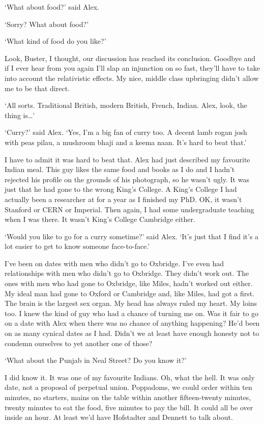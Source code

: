`What about food?' said Alex.

`Sorry? What about food?'

`What kind of food do you like?'

Look, Buster, I thought, our discussion has reached its conclusion.
Goodbye and if I ever hear from you again I'll slap an injunction on
so fast, they'll have to take into account the relativistic effects.
My nice, middle class upbringing didn't allow me to be that direct.

`All sorts. Traditional British, modern British, French, Indian.
Alex, look, the thing is\dots'

`Curry?' said Alex. `Yes, I'm a big fan of curry too. A decent lamb
rogan josh with peas pilau, a mushroom bhaji and a keema naan. It's
hard to beat that.'

I have to admit it was hard to beat that. Alex had just described my
favourite Indian meal. This guy likes the same food and books as I
do and I hadn't rejected his profile on the grounds of his
photograph, so he wasn't ugly. It was just that he had gone to the
wrong King's College. A King's College I had actually been a researcher at for a year as I finished my PhD. OK, it wasn't Stanford or CERN or Imperial. Then again, I had some undergraduate teaching when I was there. It wasn't King's College Cambridge either.

`Would you like to go for a curry sometime?' said Alex. `It's just
that I find it's a lot easier to get to know someone face-to-face.'

I've been on dates with men who didn't go to Oxbridge. I've even had
relationships with men who didn't go to Oxbridge. They didn't work
out. The ones with men who had gone to Oxbridge, like Miles, hadn't
worked out either. My ideal man had gone to Oxford or Cambridge and,
like Miles, had got a first. The brain is the largest sex organ. My
head has always ruled my heart. My loins too. I knew the kind of guy
who had a chance of turning me on. Was it fair to go on a date with
Alex when there was no chance of anything happening? He'd been on as
many cynical dates as I had. Didn't we at least have enough honesty
not to condemn ourselves to yet another one of those?

`What about the Punjab in Neal Street? Do you know it?'

I did know it. It was one of my favourite Indians. Oh, what the
hell. It was only date, not a proposal of perpetual union.
Poppadoms, we could order within ten minutes, no starters, mains on
the table within another fifteen-twenty minutes, twenty minutes to
eat the food, five minutes to pay the bill. It could all be over
inside an hour. At least we'd have Hofstadter and Dennett to talk
about.

